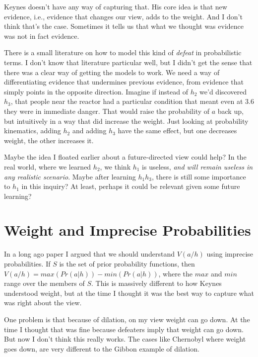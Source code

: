 \documentclass[
  11pt,
  letterpaper,
  DIV=11,
  numbers=noendperiod,
  oneside]{scrartcl}
\begin{document}
Keynes doesn't have any way of capturing that. His core idea is that new
evidence, i.e., evidence that changes our view, adds to the weight. And
I don't think that's the case. Sometimes it tells us that what we
thought was evidence was not in fact evidence.

There is a small literature on how to model this kind of \emph{defeat}
in probabilistic terms. I don't know that literature
particular well, but I didn't get the sense that there was a clear way
of getting the models to work. We need a way of differentiating evidence
that undermines previous evidence, from evidence that simply points in
the opposite direction. Imagine if instead of \(h_2\) we'd discovered
\(h_3\), that people near the reactor had a particular condition that
meant even at 3.6 they were in immediate danger. That would raise the
probability of \(a\) back up, but intuitively in a way that did increase
the weight. Just looking at probability kinematics, adding \(h_2\) and
adding \(h_3\) have the same effect, but one decreases weight, the other
increases it.

Maybe the idea I floated earlier about a future-directed view could
help? In the real world, where we learned \(h_2\), we think \(h_1\) is
useless, \emph{and will remain useless in any realistic scenario}. Maybe
after learning \(h_1h_3\), there is still some importance to \(h_1\) in
this inquiry? At least, perhaps it could be relevant given some future
learning?

\section{Weight and Imprecise
Probabilities}\label{weight-and-imprecise-probabilities}

In a long ago paper I argued that we should
understand \(V(a/h)\) using imprecise probabilities. If \(S\) is the set
of prior probability functions, then
\(V(a/h) = max(Pr(a|h)) - min(Pr(a|h))\), where the \(max\) and \(min\)
range over the members of \(S\). This is massively different to how
Keynes understood weight, but at the time I thought it was the best way
to capture what was right about the view.

One problem is that because of dilation, on my view weight can go down.
At the time I thought that was fine because defeaters imply that weight
can go down. But now I don't think this really works. The cases like
Chernobyl where weight goes down, are very different to the Gibbon
example of dilation.
\end{document}
